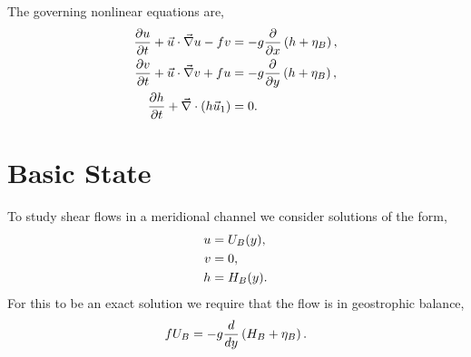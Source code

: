 \documentclass[letterpaper,10pt,english]{sphinxmanual}
\begin{document}
The governing nonlinear equations are,
\begin{gather}
\begin{split}\begin{aligned}
\frac{\partial u}{\partial t} + {\vec u} \cdot \vec \nabla u - f v &
= - g \frac{\partial}{\partial x} \left( h + \eta_B \right) , \\
 \frac{\partial v}{\partial t} + {\vec u} \cdot \vec \nabla v + f u &
= - g \frac{\partial}{\partial y} \left( h + \eta_B \right) , \\
\frac{\partial h}{\partial t} + \vec\nabla \cdot \left( h \vec u_1 \right) & = 0.\end{aligned}\end{split}\notag
\end{gather}

\section{Basic State}
\label{linear_stability:basic-state}
To study shear flows in a meridional channel we consider solutions of
the form,
\begin{gather}
\begin{split}\begin{aligned}
u & = U_B(y), \\
v & = 0,\\
h & = H_B(y).\end{aligned}\end{split}\notag
\end{gather}
For this to be an exact solution we require that the flow is in
geostrophic balance,
\begin{gather}
\begin{split}f U_B = - g \frac{d}{dy}\left( H_B + \eta_B \right).\end{split}\notag
\end{gather}
\end{document}
